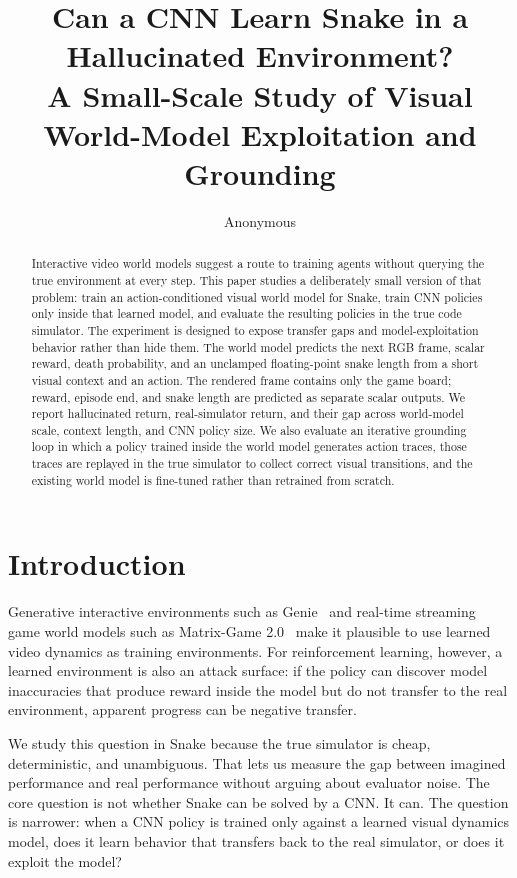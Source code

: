 \documentclass[11pt]{article}
\title{Can a CNN Learn Snake in a Hallucinated Environment?\\
\large A Small-Scale Study of Visual World-Model Exploitation and Grounding}
\author{Anonymous}
\date{}
\begin{document}
\maketitle

\begin{abstract}
Interactive video world models suggest a route to training agents without querying the true environment at every step.
This paper studies a deliberately small version of that problem: train an action-conditioned visual world model for Snake, train CNN policies only inside that learned model, and evaluate the resulting policies in the true code simulator.
The experiment is designed to expose transfer gaps and model-exploitation behavior rather than hide them.
The world model predicts the next RGB frame, scalar reward, death probability, and an unclamped floating-point snake length from a short visual context and an action.
The rendered frame contains only the game board; reward, episode end, and snake length are predicted as separate scalar outputs.
We report hallucinated return, real-simulator return, and their gap across world-model scale, context length, and CNN policy size.
We also evaluate an iterative grounding loop in which a policy trained inside the world model generates action traces, those traces are replayed in the true simulator to collect correct visual transitions, and the existing world model is fine-tuned rather than retrained from scratch.
\end{abstract}

\section{Introduction}
Generative interactive environments such as Genie~\cite{bruce2024genie} and real-time streaming game world models such as Matrix-Game 2.0~\cite{he2025matrixgame2} make it plausible to use learned video dynamics as training environments.
For reinforcement learning, however, a learned environment is also an attack surface: if the policy can discover model inaccuracies that produce reward inside the model but do not transfer to the real environment, apparent progress can be negative transfer.

We study this question in Snake because the true simulator is cheap, deterministic, and unambiguous.
That lets us measure the gap between imagined performance and real performance without arguing about evaluator noise.
The core question is not whether Snake can be solved by a CNN.
It can.
The question is narrower: when a CNN policy is trained only against a learned visual dynamics model, does it learn behavior that transfers back to the real simulator, or does it exploit the model?
\end{document}

